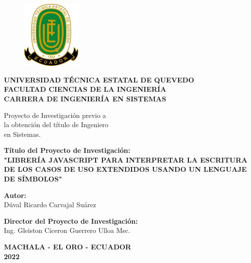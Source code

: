 \begin{center}
		\begin{figure}[htb]
		\begin{center}
			\includegraphics[width=3.04cm,height=3.39cm]{img/logoUTEQ.png}
		\end{center}
	\end{figure}
	{\caratuladc \textbf{UNIVERSIDAD TÉCNICA ESTATAL DE QUEVEDO}}\\
	\vspace*{0.2cm}
	{\titulosndc \textbf{FACULTAD CIENCIAS DE LA INGENIERÍA}}\\
	\vspace*{0.2cm}
	{\titulosndc \textbf{CARRERA DE INGENIERÍA EN SISTEMAS}}\\
	\vspace*{0.2in}
	
	\begin{flushright}
		Proyecto de Investigación previo a \\
		 la obtención del título de Ingeniero \\ en Sistemas. 
	\end{flushright}
	\vspace*{0.2in}
		
	\textbf{Título del Proyecto de Investigación:} \\
	\vspace*{0.3cm}
	\textbf{"LIBRERÍA JAVASCRIPT PARA INTERPRETAR LA ESCRITURA DE LOS CASOS DE USO EXTENDIDOS USANDO UN LENGUAJE DE SÍMBOLOS"}
	\vspace*{0.3in}
	
	\textbf{Autor:} \\
	\vspace*{0.3cm}
	Dúval Ricardo Carvajal Suárez
	\vspace*{0.3in}
	
	\textbf{Director del Proyecto de Investigación:} \\
	\vspace*{0.3cm}
	Ing. Gleiston Ciceron Guerrero Ulloa Msc.
	\vspace*{0.3in}
	
	\textbf{MACHALA - EL ORO - ECUADOR} \\
	\textbf{2022}
	
\end{center}